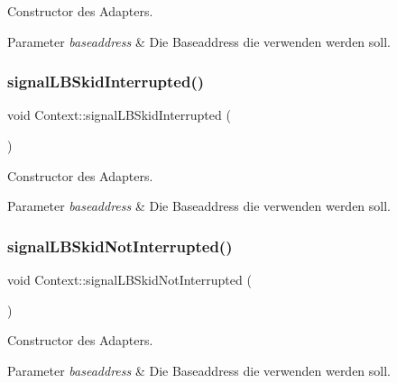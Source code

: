 Constructor des Adapters.


\begin{DoxyParams}{Parameter}
{\em baseaddress} & Die Baseaddress die verwenden werden soll. \\
\hline
\end{DoxyParams}
\hypertarget{class_context_a41c95a05dffe3e6d89ebe5a6522e3a6a}{}\label{class_context_a41c95a05dffe3e6d89ebe5a6522e3a6a} 
\subsubsection{\texorpdfstring{signal\+L\+B\+Skid\+Interrupted()}{signalLBSkidInterrupted()}\hspace{0.1cm}{\footnotesize\ttfamily [2/2]}}
{\footnotesize\ttfamily void Context\+::signal\+L\+B\+Skid\+Interrupted (\begin{DoxyParamCaption}{ }\end{DoxyParamCaption})}

Constructor des Adapters.


\begin{DoxyParams}{Parameter}
{\em baseaddress} & Die Baseaddress die verwenden werden soll. \\
\hline
\end{DoxyParams}
\hypertarget{class_context_a54d07729fce18877b7fa671e5622c2cd}{}\label{class_context_a54d07729fce18877b7fa671e5622c2cd} 
\subsubsection{\texorpdfstring{signal\+L\+B\+Skid\+Not\+Interrupted()}{signalLBSkidNotInterrupted()}\hspace{0.1cm}{\footnotesize\ttfamily [1/2]}}
{\footnotesize\ttfamily void Context\+::signal\+L\+B\+Skid\+Not\+Interrupted (\begin{DoxyParamCaption}{ }\end{DoxyParamCaption})}

Constructor des Adapters.


\begin{DoxyParams}{Parameter}
{\em baseaddress} & Die Baseaddress die verwenden werden soll. \\
\hline
\end{DoxyParams}
\hypertarget{class_context_a54d07729fce18877b7fa671e5622c2cd}{}\label{class_context_a54d07729fce18877b7fa671e5622c2cd} 
